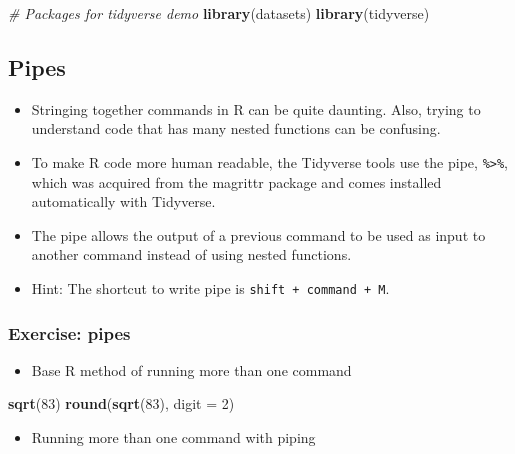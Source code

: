 \documentclass[
]{book}
\newenvironment{Shaded}{\begin{snugshade}}{\end{snugshade}}
\newcommand{\AttributeTok}[1]{\textcolor[rgb]{0.13,0.29,0.53}{#1}}
\newcommand{\CommentTok}[1]{\textcolor[rgb]{0.56,0.35,0.01}{\textit{#1}}}
\newcommand{\DecValTok}[1]{\textcolor[rgb]{0.00,0.00,0.81}{#1}}
\newcommand{\FunctionTok}[1]{\textcolor[rgb]{0.13,0.29,0.53}{\textbf{#1}}}
\newcommand{\NormalTok}[1]{#1}
\providecommand{\tightlist}{%
  \setlength{\itemsep}{0pt}\setlength{\parskip}{0pt}}
\begin{document}
\begin{Shaded}
\begin{Highlighting}[]
\CommentTok{\# Packages for tidyverse demo}
\FunctionTok{library}\NormalTok{(datasets)}
\FunctionTok{library}\NormalTok{(tidyverse)}
\end{Highlighting}
\end{Shaded}

\subsection{Pipes}\label{pipes}

\begin{itemize}
\tightlist
\item
  Stringing together commands in R can be quite daunting. Also, trying to understand code that has many nested functions can be confusing.
\item
  To make R code more human readable, the Tidyverse tools use the pipe, \texttt{\%\textgreater{}\%}, which was acquired from the magrittr package and comes installed automatically with Tidyverse.
\item
  The pipe allows the output of a previous command to be used as input to another command instead
  of using nested functions.
\item
  Hint: The shortcut to write pipe is \texttt{shift\ +\ command\ +\ M}.
\end{itemize}

\subsubsection{Exercise: pipes}\label{exercise-pipes}

\begin{itemize}
\tightlist
\item
  Base R method of running more than one command
\end{itemize}

\begin{Shaded}
\begin{Highlighting}[]
\FunctionTok{sqrt}\NormalTok{(}\DecValTok{83}\NormalTok{)}
\FunctionTok{round}\NormalTok{(}\FunctionTok{sqrt}\NormalTok{(}\DecValTok{83}\NormalTok{), }\AttributeTok{digit =} \DecValTok{2}\NormalTok{)}
\end{Highlighting}
\end{Shaded}

\begin{itemize}
\tightlist
\item
  Running more than one command with piping
\end{itemize}
\end{document}
